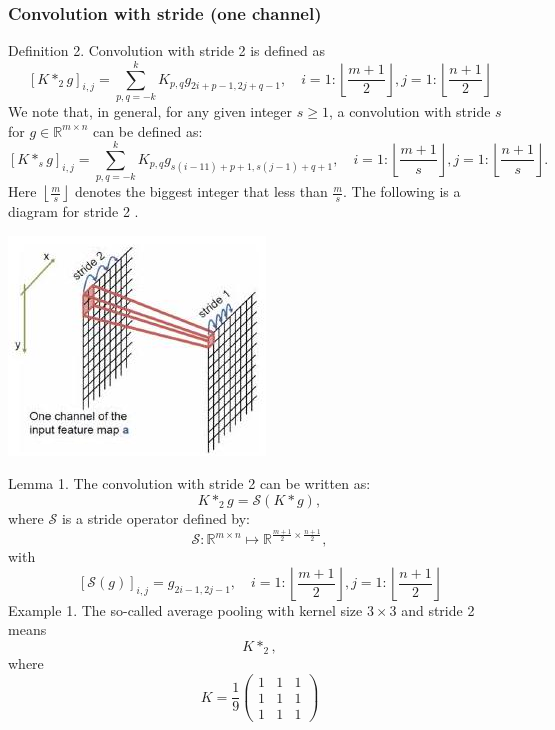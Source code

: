 \documentclass[10pt]{article}
\begin{document}
\subsubsection{Convolution with stride (one channel)}
Definition 2. Convolution with stride 2 is defined as
$$
\left[K *_{2} g\right]_{i, j}=\sum_{p, q=-k}^{k} K_{p, q} g_{2 i+p-1,2 j+q-1}, \quad i=1:\left\lfloor\frac{m+1}{2}\right\rfloor, j=1:\left\lfloor\frac{n+1}{2}\right\rfloor
$$
We note that, in general, for any given integer $s \geq 1$, a convolution with stride $s$ for $g \in \mathbb{R}^{m \times n}$ can be defined as:
$$
\left[K *_{s} g\right]_{i, j}=\sum_{p, q=-k}^{k} K_{p, q} g_{s(i-11)+p+1, s(j-1)+q+1}, \quad i=1:\left\lfloor\frac{m+1}{s}\right\rfloor, j=1:\left\lfloor\frac{n+1}{s}\right\rfloor .
$$
Here $\left\lfloor\frac{m}{s}\right\rfloor$ denotes the biggest integer that less than $\frac{m}{s}$. The following is a diagram for stride 2 .

\includegraphics[max width=\textwidth]{2022_01_06_b5ce182ed1bd5f482e5bg-05(1)}

Lemma 1. The convolution with stride 2 can be written as:
$$
K *_{2} g=\mathcal{S}(K * g),
$$
where $\mathcal{S}$ is a stride operator defined by:
$$
\mathcal{S}: \mathbb{R}^{m \times n} \mapsto \mathbb{R}^{\frac{m+1}{2} \times \frac{n+1}{2}},
$$
with
$$
[\mathcal{S}(g)]_{i, j}=g_{2 i-1,2 j-1}, \quad i=1:\left\lfloor\frac{m+1}{2}\right\rfloor, j=1:\left\lfloor\frac{n+1}{2}\right\rfloor
$$
Example 1. The so-called average pooling with kernel size $3 \times 3$ and stride 2 means
$$
K *_{2},
$$
where
$$
K=\frac{1}{9}\left(\begin{array}{lll}
1 & 1 & 1 \\
1 & 1 & 1 \\
1 & 1 & 1
\end{array}\right)
$$
\end{document}
